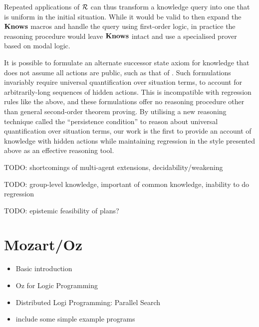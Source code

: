 Repeated applications of $\mathcal{R}$ can thus transform a knowledge query
into one that is uniform in the initial situation. While it would
be valid to then expand the $\mathbf{Knows}$ macros and handle the query
using first-order logic, in practice the reasoning procedure would
leave $\mathbf{Knows}$ intact and use a specialised prover based on modal
logic.

It is possible to formulate an alternate successor state axiom for
knowledge that does not assume all actions are public, such as that
of \citet{Lesperance99sitcalc_approach}. Such formulations invariably
require universal quantification over situation terms, to account
for arbitrarily-long sequences of hidden actions. This is incompatible
with regression rules like the above, and these formulations offer
no reasoning procedure other than general second-order theorem proving.
By utilising a new reasoning technique called the {}``persistence
condition'' to reason about universal quantification over situation
terms, our work is the first to provide an account of knowledge with
hidden actions while maintaining regression in the style presented
above as an effective reasoning tool.

TODO: shortcomings of multi-agent extensions, decidability/weakening
\citet{demolombe00tractable_sc_belief} \citet{petrick02knowledge_equivalence}

TODO: group-level knowledge, important of common knowledge, inability
to do regression

TODO: epistemic feasibility of plans? \citet{giacomo04sem_delib_indigolog,Lesperance01epi_feas_casl}


\section{Mozart/Oz\label{sec:Background:Mozart/Oz}}

\begin{itemize}
\item Basic introduction \citet{vanroy99mozart} 
\item Oz for Logic Programming \citet{vanroy03mozart_logic} 
\item Distributed Logi Programming: Parallel Search \citet{schulte00oz_parallel} 
\item include some simple example programs 
\end{itemize}

